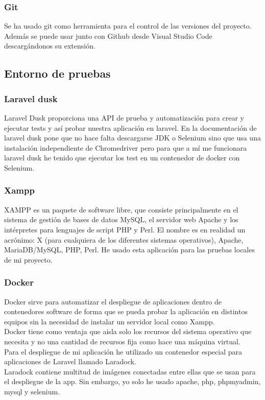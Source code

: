 \subsubsection{Git}
Se ha usado git como herramienta para el control de las versiones del proyecto. Además se puede usar junto con Github desde Visual Studio Code descargándonos su extensión.

\subsection{Entorno de pruebas}

\subsubsection{Laravel dusk}
Laravel Dusk proporciona una API de prueba y automatización para crear y ejecutar tests y así probar nuestra aplicación en laravel.
En la documentación de laravel dusk pone que no hace falta descargarse JDK o Selenium sino que usa una instalación independiente de Chromedriver pero para que a mí me funcionara laravel dusk he tenido que ejecutar los test en un contenedor de docker con Selenium.\cite{LaravelDusk}

\subsubsection{Xampp}
XAMPP es un paquete de software libre, que consiste principalmente en el sistema de gestión de bases de datos MySQL, el servidor web Apache y los intérpretes para lenguajes de script PHP y Perl. El nombre es en realidad un acrónimo: X (para cualquiera de los diferentes sistemas operativos), Apache, MariaDB/MySQL, PHP, Perl.\cite{Xampp}
He usado esta aplicación para las pruebas locales de mi proyecto.
\subsubsection{Docker}
Docker sirve para automatizar el despliegue de aplicaciones dentro de contenedores software de forma que se pueda probar la aplicación en distintos equipos sin la necesidad de instalar un servidor local como Xampp.\\ \cite{Docker}
Docker tiene como ventaja que aisla solo los recursos del sistema operativo que necesita y no una cantidad de recursos fija como hace una máquina virtual.\\
Para el despliegue de mi aplicación he utilizado un contenedor especial para aplicaciones de Laravel llamado Laradock.\\
Laradock contiene multitud de imágenes conectadas entre ellas que se usan para el despliegue de la app. Sin embargo, yo solo he usado apache, php, phpmyadmin, mysql y selenium.\\
